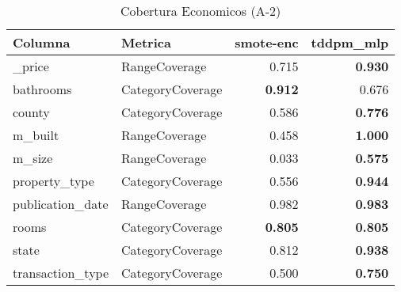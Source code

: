 \begin{table}[H]
\centering
\caption{Cobertura Economicos (A-2)}
\label{table-coverage-economicos-a-2}
\begin{tabular}{|l|l|r|r|}
\hline
\rowcolor[gray]{0.8}
Columna & Metrica & smote-enc & tddpm\_mlp \\
\hline \_price & RangeCoverage & 0.715 & \bfseries 0.930 \\
\hline bathrooms & CategoryCoverage & \bfseries 0.912 & 0.676 \\
\hline county & CategoryCoverage & 0.586 & \bfseries 0.776 \\
\hline m\_built & RangeCoverage & 0.458 & \bfseries 1.000 \\
\hline m\_size & RangeCoverage & 0.033 & \bfseries 0.575 \\
\hline property\_type & CategoryCoverage & 0.556 & \bfseries 0.944 \\
\hline publication\_date & RangeCoverage & 0.982 & \bfseries 0.983 \\
\hline rooms & CategoryCoverage & \bfseries 0.805 & \bfseries 0.805 \\
\hline state & CategoryCoverage & 0.812 & \bfseries 0.938 \\
\hline transaction\_type & CategoryCoverage & 0.500 & \bfseries 0.750 \\
\hline
\end{tabular}
\end{table}
